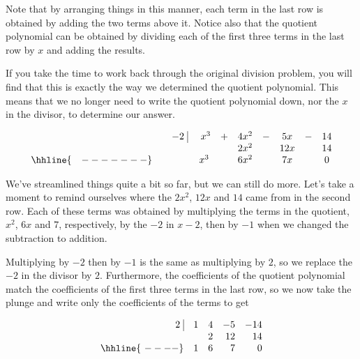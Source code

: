 \documentclass{ximera}
\begin{document}
\setlength\arraycolsep{5pt}
\setlength\extrarowheight{0pt}

Note that by arranging things in this manner, each term in the last row is obtained by adding the two terms above it.  Notice also that the quotient polynomial can be obtained by dividing each of the first three terms in the last row by $x$ and adding the results.   

\medskip

If you take the time to work back through the original division problem, you will find that this is exactly the way we determined the quotient polynomial.  This means that we no longer need to write the quotient polynomial down, nor the $x$ in the divisor, to determine our answer.

\setlength\arraycolsep{0.1pt}
\setlength\extrarowheight{2pt}

\[ \begin{array}{cccccccccc}


 & & - 2 \, \, \vline& \, \, x^3 & + & 4x^2 & - & 5x & - & 14 \\

 &  &  &   & &   2x^2 &  & 12x &  & 14 \\ \hhline{~~~-------} 
 &  &  & x^3  &  & 6 x^2 &  & 7x &  &0  \\  
\end{array}\]

\setlength\arraycolsep{5pt}
\setlength\extrarowheight{0pt}

We've streamlined things quite a bit so far, but we can still do more.  Let's take a moment to remind ourselves where the $2x^2$, $12x$ and $14$ came from in the second row.  Each of these terms was obtained by multiplying the terms in the quotient, $x^2$, $6x$ and $7$, respectively, by the $-2$ in $x-2$,  then by $-1$ when we changed the subtraction to addition. 

\medskip

 Multiplying by $-2$ then by $-1$ is the same as multiplying by $2$, so we replace the $-2$ in the divisor by $2$.   Furthermore, the coefficients of the quotient polynomial match the coefficients of the first three terms in the last row, so we now take the plunge and write only the coefficients of the terms to get



\[ \begin{array}{rrrrr}


  2 \, \, \vline& 1 & 4 & -5  & -14 \\

   &&   2 &   12 &   14 \\ \hhline{~----} 
  & 1  &   6  &  7 &  0  \\  
\end{array}\]
\end{document}

